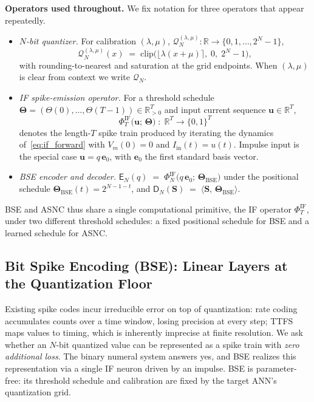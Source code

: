 \documentclass{article}
\theoremstyle{plain}
\theoremstyle{definition}
\theoremstyle{remark}
\begin{document}
\noindent\textbf{Operators used throughout.}
We fix notation for three operators that appear repeatedly.
\begin{itemize}
  \item[(i)] \emph{$N$-bit quantizer.} For calibration $(\lambda,\mu)$,
        $\mathcal{Q}_N^{(\lambda,\mu)} : \mathbb{R} \to \{0,1,\dots,2^N-1\}$,
        \[
          \mathcal{Q}_N^{(\lambda,\mu)}(x)
          \;=\; \mathrm{clip}\!\bigl(\lfloor \lambda(x+\mu)\rceil,\; 0,\; 2^N-1\bigr),
        \]
        with rounding-to-nearest and saturation at the grid endpoints.
        When $(\lambda,\mu)$ is clear from context we write $\mathcal{Q}_N$.
  \item[(ii)] \emph{IF spike-emission operator.} For a threshold schedule
        $\boldsymbol{\Theta}=(\Theta(0),\dots,\Theta(T-1))\in\mathbb{R}_{>0}^{T}$
        and input current sequence $\mathbf{u}\in\mathbb{R}^T$,
        \[
          \Phi_T^{\mathrm{IF}}\!\bigl(\mathbf{u};\,\boldsymbol{\Theta}\bigr)
          \;:\;\mathbb{R}^T \longrightarrow \{0,1\}^T
        \]
        denotes the length-$T$ spike train produced by iterating the dynamics
        of~\eqref{eq:if_forward} with $V_m(0)=0$ and $I_{\mathrm{in}}(t)=u(t)$.
        Impulse input is the special case $\mathbf{u}=q\,\mathbf{e}_0$, with
        $\mathbf{e}_0$ the first standard basis vector.
  \item[(iii)] \emph{BSE encoder and decoder.}
        $\mathsf{E}_N(q) \;=\; \Phi_N^{\mathrm{IF}}\!\bigl(q\,\mathbf{e}_0;\,
        \boldsymbol{\Theta}_{\mathrm{BSE}}\bigr)$
        under the positional schedule $\boldsymbol{\Theta}_{\mathrm{BSE}}(t)
        = 2^{N-1-t}$, and
        $\mathsf{D}_N(\mathbf{S}) \;=\; \langle\mathbf{S},\,
        \boldsymbol{\Theta}_{\mathrm{BSE}}\rangle$.
\end{itemize}
BSE and ASNC thus share a single computational primitive, the IF operator
$\Phi_T^{\mathrm{IF}}$, under two different threshold schedules: a fixed
positional schedule for BSE and a learned schedule for ASNC.


\subsection{Bit Spike Encoding (BSE): Linear Layers at the Quantization Floor}
\label{subsec:bse}

Existing spike codes incur irreducible error on top of quantization: rate
coding accumulates counts over a time window, losing precision at every
step; TTFS maps values to timing, which is inherently imprecise at finite
resolution. We ask whether an $N$-bit quantized value can be represented as
a spike train with \emph{zero additional loss}. The binary numeral system
answers yes, and BSE realizes this representation via a single IF neuron
driven by an impulse. BSE is parameter-free: its threshold schedule and
calibration are fixed by the target ANN's quantization grid.
\end{document}
